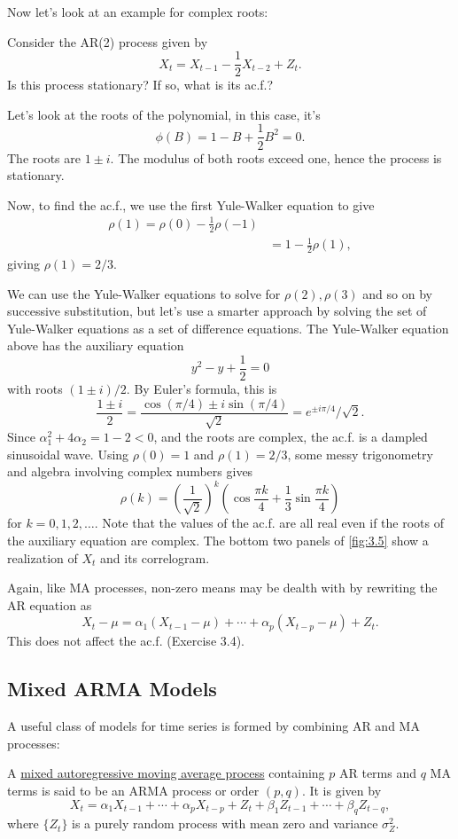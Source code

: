 Now let's look at an example for complex roots:
\begin{example}[]
\label{ex:3.1}
Consider the AR(2) process given by 
\[ X_t = X_{t-1} - \frac{1}{2}X_{t-2} + Z_t. \]
Is this process stationary? If so, what is its ac.f.?

Let's look at the roots of the polynomial, in this case, it's
\[ \phi(B) = 1 - B + \frac{1}{2}B^2 = 0. \]
The roots are $1 \pm i$. The modulus of both roots exceed one, hence the process is stationary.

Now, to find the ac.f., we use the first Yule-Walker equation to give 
\begin{align*}
	\rho(1) = \rho(0) - \frac{1}{2}\rho(-1) \\
	&= 1 - \frac{1}{2}\rho(1),
\end{align*}
giving $\rho(1) = 2/3$. 

We can use the Yule-Walker equations to solve for $\rho(2), \rho(3)$ and so on by successive substitution, but 
let's use a smarter approach by solving the set of Yule-Walker equations as a set of difference equations. The 
Yule-Walker equation above has the auxiliary equation 
\[ y^2 - y + \frac{1}{2} = 0 \]
with roots $(1 \pm i)/2$. By Euler's formula, this is 
\[ \frac{1 \pm i}{2} = \frac{\cos{(\pi/4)} \pm i \sin{(\pi/4)}}{\sqrt{2}} = e^{\pm i \pi/4} / \sqrt{2}. \]
Since $\alpha_1^2 + 4 \alpha_2 = 1 - 2 < 0$, and the roots are complex, the ac.f. is a dampled sinusoidal wave. 
Using $\rho(0) = 1$ and $\rho(1) = 2/3$, some messy trigonometry and algebra involving complex numbers gives 
\[ \rho(k) = \left( \frac{1}{\sqrt{2}} \right)^k \left( \cos{\frac{\pi k}{4}} + \frac{1}{3} 
\sin{\frac{\pi k}{4}} \right) \]
for $k = 0, 1, 2, \dots$. Note that the values of the ac.f. are all real even if the roots of the auxiliary 
equation are complex. The bottom two panels of \cref{fig:3.5} show a realization of $X_t$ and its correlogram.
\end{example}

Again, like MA processes, non-zero means may be dealth with by rewriting the AR equation as 
\[ X_t - \mu = \alpha_1 (X_{t-1} - \mu) + \cdots + \alpha_p (X_{t-p} - \mu) + Z_t. \]
This does not affect the ac.f. (Exercise 3.4).



\subsection{Mixed ARMA Models}
A useful class of models for time series is formed by combining AR and MA processes:
\begin{definition*}[]

A \underline{mixed autoregressive moving average process} containing $p$ AR terms and $q$ MA terms is said to be 
an ARMA process or order $(p, q)$. It is given by 
\[ X_t = \alpha_1 X_{t-1} + \cdots + \alpha_p X_{t-p} + Z_t + \beta_1 Z_{t-1} + \cdots + \beta_q Z_{t-q}, \]
where $\{ Z_t \}$ is a purely random process with mean zero and variance $\sigma_Z^2$.
\end{definition*}


